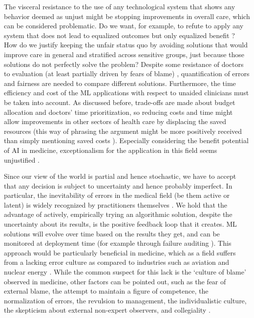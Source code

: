     The visceral resistance to the use of any technological system that shows any behavior deemed as unjust might be stopping improvements in overall care, which can be considered problematic.
    Do we want, for example, to refute to apply any system that does not lead to equalized outcomes but only equalized benefit \cite{Rajkomar2018}?
    How do we justify keeping the unfair status quo by avoiding solutions that would improve care in general and stratified across sensitive groups, just because those solutions do not perfectly solve the problem?
    Despite some resistance of doctors to evaluation (at least partially driven by fears of blame) \cite{Waring2005}, quantification of errors and fairness are needed to compare different solutions.
    Furthermore, the time efficiency and cost of the ML applications with respect to unaided clinicians must be taken into account.
    As discussed before, trade-offs are made about budget allocation and doctors' time prioritization, so reducing costs and time might allow improvements in other sectors of health care by displacing the saved resources (this way of phrasing the argument might be more positively received than simply mentioning saved costs \cite{Tetlock2003}).
    Especially considering the benefit potential of AI in medicine, exceptionalism for the application in this field seems unjustified \cite{Fletcher2021}.

    Since our view of the world is partial and hence stochastic, we have to accept that any decision is subject to uncertainty and hence probably imperfect.
    In particular, the inevitability of errors in the medical field (be them active or latent) is widely recognized by practitioners themselves \cite{Waring2005}.
    We hold that the advantage of actively, empirically trying an algorithmic solution, despite the uncertainty about its results, is the positive feedback loop that it creates.
    ML solutions will evolve over time based on the results they get, and can be monitored at deployment time (for example through failure auditing \cite{Chen2021}).
    This approach would be particularly beneficial in medicine, which as a field suffers from a lacking error culture as compared to industries such as aviation and nuclear energy \cite{Waring2005}.
    While the common suspect for this lack is the `culture of blame' observed in medicine, other factors can be pointed out, such as the fear of external blame, the attempt to maintain a figure of competence, the normalization of errors, the revulsion to management, the individualistic culture, the skepticism about external non-expert observers, and collegiality \cite{Waring2005}.

